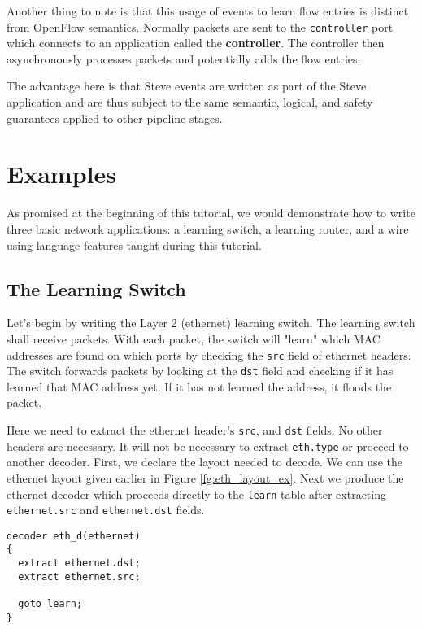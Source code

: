 Another thing to note is that this usage of events to learn flow entries is distinct from OpenFlow semantics. Normally packets are sent to the \texttt{controller} port which connects to an application called the \textbf{controller}. The controller then asynchronously processes packets and potentially adds the flow entries.

The advantage here is that Steve events are written as part of the Steve application and are thus subject to the same semantic, logical, and safety guarantees applied to other pipeline stages. 

\section{Examples} \label{examples_tut}

As promised at the beginning of this tutorial, we would demonstrate how to write three basic network applications: a learning switch, a learning router, and a wire using language features taught during this tutorial.

\subsection{The Learning Switch} \label{learning_switch}

Let's begin by writing the Layer 2 (ethernet) learning switch. The learning switch shall receive packets. With each packet, the switch will "learn" which MAC addresses are found on which ports by checking the \texttt{src} field of ethernet headers. The switch forwards packets by looking at the \texttt{dst} field and checking if it has learned that MAC address yet. If it has not learned the address, it floods the packet.

Here we need to extract the ethernet header's \texttt{src}, and \texttt{dst} fields. No other headers are necessary. It will not be necessary to extract \texttt{eth.type} or proceed to another decoder. First, we declare the layout needed to decode. We can use the ethernet layout given earlier in Figure \ref{fg:eth_layout_ex}. Next we produce the ethernet decoder which proceeds directly to the \texttt{learn} table after extracting \texttt{ethernet.src} and \texttt{ethernet.dst} fields.

\begin{lstlisting}
decoder eth_d(ethernet)
{
  extract ethernet.dst;
  extract ethernet.src;
  
  goto learn;
}
\end{lstlisting}


